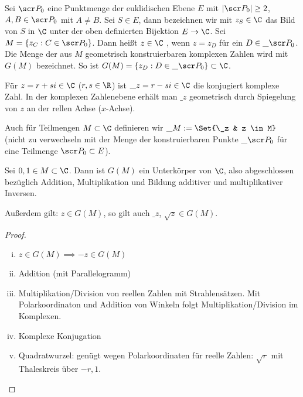 \begin{df} \label{18.5-3}
	Sei $\scr P_0$ eine Punktmenge der euklidischen Ebene $E$ mit $|\scr P_0| \ge 2$, $A, B \in \scr P_0$ mit $A \neq B$.
	Sei $S \in E$, dann bezeichnen wir mit $z_S \in \C$ das Bild von $S$ in $\C$ unter der oben definierten Bijektion $E \to \C$.
	Sei $M = \{z_C : C \in \scr P_0\}$.
	Dann heißt $z \in \C$ , wenn $z = z_D$ für ein $D \in \_{\scr P_0}$.
	Die Menge der aus $M$ geometrisch konstruierbaren komplexen Zahlen wird mit $G(M)$ bezeichnet.
	So ist $G(M) = \{ z_D : D \in \_{\scr P_0} \} \subset \C$.
\end{df}

\begin{note}
	Für $z = r + si \in \C$ ($r, s \in \R$) ist $\_z = r - si \in \C$ die konjugiert komplexe Zahl.
	In der komplexen Zahlenebene erhält man $\_z$ geometrisch durch Spiegelung von $z$ an der rellen Achse ($x$-Achse).

	Auch für Teilmengen $M \subset \C$ definieren wir $\_M := \Set{\_z & z \in M}$ (nicht zu verwechseln mit der Menge der konstruierbaren Punkte $\_{\scr P_0}$ für eine Teilmenge $\scr P_0 \subset E$).
\end{note}

\begin{st} \label{18.5-4}
	Sei $0, 1 \in M \subset \C$.
	Dann ist $G(M)$ ein Unterkörper von $\C$, also abgeschlossen bezüglich Addition, Multiplikation und Bildung additiver und multiplikativer Inversen.

	Außerdem gilt: $z \in G(M)$, so gilt auch $\_z$, $\sqrt z \in G(M)$.
	\begin{proof}
		\begin{enumerate}[i)]
			\item
				$z \in G(M) \implies -z \in G(M)$
			\item
				Addition (mit Parallelogramm)
			\item
				Multiplikation/Division von reellen Zahlen mit Strahlensätzen.
				Mit Polarkoordinaton und Addition von Winkeln folgt Multiplikation/Division im Komplexen.
			\item
				Komplexe Konjugation
			\item
				Quadratwurzel:
				genügt wegen Polarkoordinaten für reelle Zahlen: $\sqrt{r}$ mit Thaleskreis über $-r, 1$.
		\end{enumerate}
	\end{proof}
\end{st}

